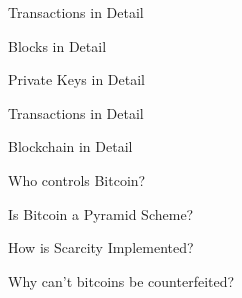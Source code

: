 \documentclass[12pt, usepdftitle=false]{beamer}
\begin{document}
\begin{frame}{Transactions in Detail}
\end{frame}


\begin{frame}{Blocks in Detail}
\end{frame}


\begin{frame}{Private Keys in Detail}
\end{frame}


\begin{frame}{Transactions in Detail}
\end{frame}


\begin{frame}{Blockchain in Detail}
\end{frame}


\begin{frame}{Who controls Bitcoin?}
\end{frame}


\begin{frame}{Is Bitcoin a Pyramid Scheme?}
\end{frame}


\begin{frame}{How is Scarcity Implemented?}
\end{frame}


\begin{frame}{Why can't bitcoins be counterfeited?}
\end{frame}
\end{document}
